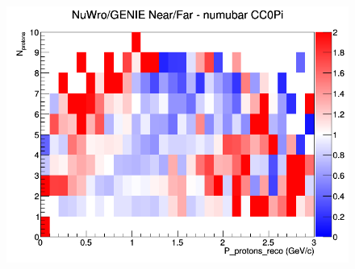 \begin{figure}[h]
\endminipage
{}
\includegraphics[width=\linewidth]{eff_N_P/FGT/protons/ratios/CC0Pi_NuWro_GENIE_numubar_NF_N_P.png}
\endminipage
\newline
\end{figure}
\clearpage
